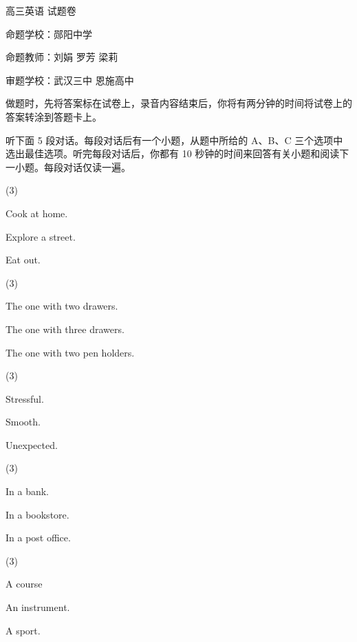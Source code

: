 \documentclass{英语试卷}
\begin{document}
\par 高三英语 试题卷\par
\par 命题学校：郧阳中学\par
\par 命题教师：刘娟 罗芳 梁莉\par
\par 审题学校：武汉三中 恩施高中\par
{}
\par 做题时，先将答案标在试卷上，录音内容结束后，你将有两分钟的时间将试卷上的答案转涂到答题卡上。\par
{}
\par 听下面 5 段对话。每段对话后有一个小题，从题中所给的 A、B、C 三个选项中选出最佳选项。听完每段对话后，你都有 10 秒钟的时间来回答有关小题和阅读下一小题。每段对话仅读一遍。\par
{}
\begin{choices}(3)
  \item Cook at home.
  \item Explore a street.
  \item Eat out.
\end{choices}
\begin{choices}(3)
  \item The one with two drawers.
  \item The one with three drawers.
  \item The one with two pen holders.
\end{choices}
\begin{choices}(3)
  \item Stressful.
  \item Smooth.
  \item Unexpected.
\end{choices}
\begin{choices}(3)
  \item In a bank.
  \item In a bookstore.
  \item In a post office.
\end{choices}
\begin{choices}(3)
  \item A course
  \item An instrument.
  \item A sport.
\end{choices}
\end{document}
